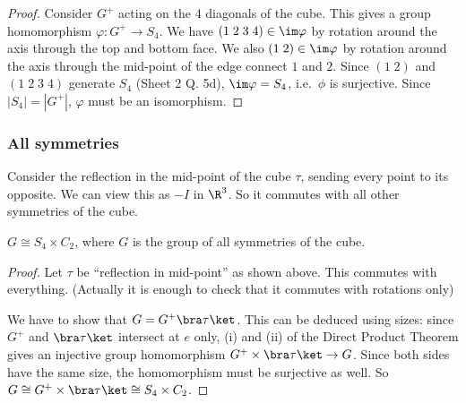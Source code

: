 \documentclass[a4paper]{article}
\begin{document}
\begin{proof}
  Consider $G^+$ acting on the 4 diagonals of the cube. This gives a group homomorphism $\varphi: G^+ \to S_4$. We have $(1\; 2\; 3\; 4)\in\im \varphi$ by rotation around the axis through the top and bottom face. We also $(1\; 2)\in \im \varphi$ by rotation around the axis through the mid-point of the edge connect $1$ and $2$. Since $(1\; 2)$ and $(1\; 2\; 3\; 4)$ generate $S_4$ (Sheet 2 Q. 5d), $\im\varphi = S_4$, i.e.\ $\phi$ is surjective. Since $|S_4| = |G^+|$, $\varphi$ must be an isomorphism.
\end{proof}

\subsubsection*{All symmetries}
Consider the reflection in the mid-point of the cube $\tau$, sending every point to its opposite. We can view this as $-I$ in $\R^3$. So it commutes with all other symmetries of the cube.
\begin{prop}
  $G \cong S_4\times C_2$, where $G$ is the group of all symmetries of the cube.
\end{prop}

\begin{proof}
  Let $\tau$ be ``reflection in mid-point'' as shown above. This commutes with everything. (Actually it is enough to check that it commutes with rotations only)

  We have to show that $G = G^+\bra \tau\ket$. This can be deduced using sizes: since $G^+$ and $\bra\tau\ket$ intersect at $e$ only, (i) and (ii) of the Direct Product Theorem gives an injective group homomorphism $G^+\times \bra\tau\ket \to G$. Since both sides have the same size, the homomorphism must be surjective as well. So $G\cong G^+\times \bra \tau\ket \cong S_4\times C_2$.
\end{proof}
\end{document}
